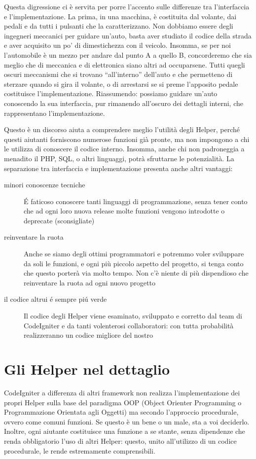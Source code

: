 Questa digressione ci è servita per porre l'accento sulle differenze tra l'interfaccia e l'implementazione. La prima, in una macchina, è costituita dal volante, dai pedali e da tutti i pulsanti che la caratterizzano. Non dobbiamo essere degli ingegneri meccanici per guidare un'auto, basta aver studiato il codice della strada e aver acquisito un po' di dimestichezza con il veicolo. Insomma, se per noi l'automobile è un mezzo per andare dal punto A a quello B, concorderemo che sia meglio che di meccanica e di elettronica siano altri ad occuparsene. Tutti quegli oscuri meccanismi che si trovano ``all'interno'' dell'auto e che permetteno di sterzare quando si gira il volante, o di arrestarsi se si preme l'apposito pedale costituisce l'implementazione. Riassumendo: possiamo guidare un'auto conoscendo la sua interfaccia, pur rimanendo all'oscuro dei dettagli interni, che rappresentano l'implementazione.

Questo è un discorso aiuta a comprendere meglio l'utilità degli Helper, perché questi aiutanti forniscono numerose funzioni già pronte, ma non impongono a chi le utilizza di conoscere il codice interno. Insomma, anche chi non padroneggia a menadito il \ac{PHP}, \ac{SQL}, o altri linguaggi, potrà sfruttarne le potenzialità. La separazione tra interfaccia e implementazione presenta anche altri vantaggi:

\begin{description}
\item[minori conoscenze tecniche] \'E faticoso conoscere tanti linguaggi di programmazione, senza tener conto che ad ogni loro nuova release molte funzioni vengono introdotte o deprecate (sconsigliate)
\item[reinventare la ruota] Anche se siamo degli ottimi programmatori e potremmo voler sviluppare da soli le funzioni, e ogni più piccolo aspetto del progetto, si tenga conto che questo porterà via molto tempo. Non c'è niente di più dispendioso che reinventare la ruota ad ogni nuovo progetto
\item[il codice altrui \'e sempre pi\'u verde] Il codice degli Helper viene esaminato, sviluppato e corretto dal team di CodeIgniter e da tanti volenterosi collaboratori: con tutta probabilità realizzeranno un codice migliore del nostro
\end{description}

\section{Gli Helper nel dettaglio}
CodeIgniter a differenza di altri framework non realizza l'implementazione dei propri Helper sulla base del paradigma OOP (Object Orienter Programming o Programmazione Orientata agli Oggetti) ma secondo l'approccio procedurale, ovvero come comuni funzioni. Se questo è un bene o un male, sta a voi deciderlo. Inoltre, ogni aiutante costituisce una funzione a se stante, senza dipendenze che renda obbligatorio l'uso di altri Helper: questo, unito all'utilizzo di un codice procedurale, le rende estremamente comprensibili.

